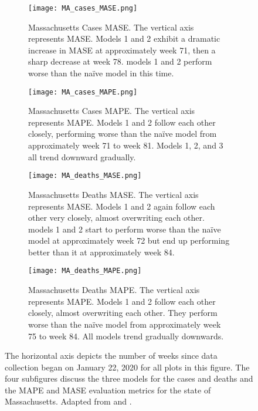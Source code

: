 \begin{figure}
\centering
\begin{subfigure}[t]{0.45\textwidth}
\texttt{[image: MA\_cases\_MASE.png]}
\caption{Massachusetts Cases {MASE}. The vertical axis represents MASE. Models 1 and 2 exhibit a dramatic increase in {MASE} at approximately week 71, then a sharp decrease at week 78. models 1 and 2 perform worse than the na\"ive model in this time.}
\end{subfigure}\hfill
\begin{subfigure}[t]{0.45\textwidth}
\texttt{[image: MA\_cases\_MAPE.png]}
\caption{Massachusetts Cases {MAPE}. The vertical axis represents MAPE. Models 1 and 2 follow each other closely, performing worse than the na\"ive model from approximately week 71 to week 81. Models 1, 2, and 3 all trend downward gradually.}
\end{subfigure}
\begin{subfigure}[t]{0.45\textwidth}
\texttt{[image: MA\_deaths\_MASE.png]}
\caption{Massachusetts Deaths {MASE}. The vertical axis represents MASE. Models 1 and 2 again follow each other very closely, almost overwriting each other. models 1 and 2 start to perform worse than the na\"ive model at approximately week 72 but end up performing better than it at approximately week 84.}
\end{subfigure}\hfill
\begin{subfigure}[t]{0.45\textwidth}
\texttt{[image: MA\_deaths\_MAPE.png]}
\caption{Massachusetts Deaths {MAPE}. The vertical axis represents MAPE. Models 1 and 2 follow each other closely, almost overwriting each other. They perform worse than the na\"ive model from approximately week 75 to week 84. All models trend gradually downwards.}
\end{subfigure}
\caption{The horizontal axis depicts the number of weeks since data collection began on January 22, 2020 for all plots in this figure. The four subfigures discuss the three models for the cases and deaths and the MAPE and MASE evaluation metrics for the state of Massachusetts. Adapted from \cite{USCB:2019} and \cite{USAFacts:2021a}.
}
\label{fig:MA}
\end{figure}
 


